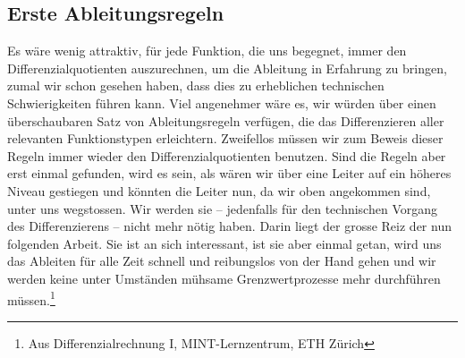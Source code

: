 







\subsection{Erste Ableitungsregeln}
\grqq Es wäre wenig attraktiv, für jede Funktion, die uns begegnet, immer den Differenzialquotienten auszurechnen, um die Ableitung in Erfahrung zu bringen, zumal wir schon gesehen haben, dass dies zu erheblichen technischen Schwierigkeiten führen kann. Viel angenehmer wäre es, wir würden über einen überschaubaren Satz von Ableitungsregeln verfügen, die das Differenzieren aller relevanten Funktionstypen erleichtern. Zweifellos müssen wir zum Beweis dieser Regeln immer wieder den Differenzialquotienten benutzen. Sind die Regeln aber erst einmal gefunden, wird es sein, als wären wir über eine Leiter auf ein höheres Niveau gestiegen und könnten die Leiter nun, da wir oben angekommen sind, unter uns wegstossen. Wir werden sie – jedenfalls für den technischen Vorgang des Differenzierens – nicht mehr nötig haben. Darin liegt der grosse Reiz der nun folgenden Arbeit. Sie ist an sich interessant, ist sie aber einmal getan, wird uns das Ableiten für alle Zeit schnell und reibungslos von der Hand gehen und wir werden keine unter Umständen mühsame Grenzwertprozesse mehr durchführen müssen.\glqq{}\footnote{Aus \glqq Differenzialrechnung I\grqq{}, MINT-Lernzentrum, ETH Zürich}


